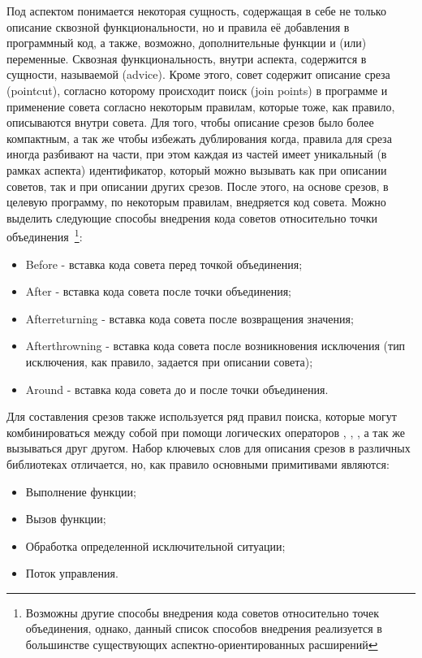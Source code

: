 Под аспектом понимается некоторая сущность, содержащая в себе не только описание
сквозной функциональности, но и правила её добавления в программный код, а
также, возможно, дополнительные функции и (или) переменные.
Сквозная функциональность, внутри аспекта, содержится в сущности, называемой
 (advice).
Кроме этого, совет содержит описание среза (pointcut), согласно которому
происходит поиск  (join points) в программе и применение
совета согласно некоторым правилам, которые тоже, как правило, описываются
внутри совета.
Для того, чтобы описание срезов было более компактным, а так же чтобы избежать
дублирования когда, правила для среза иногда разбивают на части, при этом каждая
из частей имеет уникальный (в рамках аспекта) идентификатор, который можно
вызывать как при описании советов, так и при описании других срезов.
После этого, на основе срезов, в целевую программу, по некоторым правилам,
внедряется код совета.
Можно выделить следующие способы внедрения кода советов относительно точки
объединения~\footnote{Возможны другие способы внедрения кода советов
относительно точек объединения, однако, данный список способов внедрения
реализуется в большинстве существующих аспектно-ориентированных расширений}:
\begin{itemize}
  \item Before - вставка кода совета перед точкой объединения;
  \item After - вставка кода совета после точки объединения;
  \item Afterreturning - вставка кода совета после возвращения значения;
  \item Afterthrowning - вставка кода совета после возникновения исключения
  (тип исключения, как правило, задается при описании совета);
  \item Around - вставка кода совета до и после точки объединения.
\end{itemize}

Для составления срезов также используется ряд правил поиска, которые могут
комбинироваться между собой при помощи логических операторов ,
, , а так же вызываться друг другом.
Набор ключевых слов для описания срезов в различных библиотеках отличается, но,
как правило основными примитивами являются:
\begin{itemize}
  \item Выполнение функции;
  \item Вызов функции;
  \item Обработка определенной исключительной ситуации;
  \item Поток управления.
\end{itemize}

